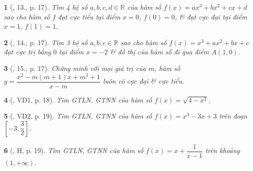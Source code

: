 \documentclass{article}
\newtheorem{baitoan}{}
\begin{document}
\begin{baitoan}[\cite{SGK_Toan_12_giai_tich_nang_cao}, 13., p. 17]
	Tìm 4 hệ số $a,b,c,d\in\mathbb{R}$ của hàm số $f(x) = ax^3 + bx^2 + cx + d$ sao cho hàm số $f$ đạt cực tiểu tại điểm $x = 0$, $f(0) = 0$, \& đạt cực đại tại điểm $x = 1$, $f(1) = 1$.
\end{baitoan}

\begin{baitoan}[\cite{SGK_Toan_12_giai_tich_nang_cao}, 14., p. 17]
	Tìm 3 hệ số $a,b,c\in\mathbb{R}$ sao cho hàm số $f(x) = x^3 + ax^2 + bx + c$ đạt cực trị bằng $0$ tại điểm $x = -2$ \& đồ thị của hàm số đi qua điểm $A(1,0)$.
\end{baitoan}

\begin{baitoan}[\cite{SGK_Toan_12_giai_tich_nang_cao}, 15., p. 17]
	Chứng minh với mọi giá trị của $m$, hàm số $y = \dfrac{x^2 - m(m + 1)x + m^3 + 1}{x - m}$ luôn có cực đại \& cực tiểu.
\end{baitoan}

\begin{baitoan}[\cite{SGK_Toan_12_giai_tich_nang_cao}, VD1, p. 18]
	Tìm {\rm GTLN, GTNN} của hàm số $f(x) = \sqrt{4 - x^2}$.
\end{baitoan}

\begin{baitoan}[\cite{SGK_Toan_12_giai_tich_nang_cao}, VD2, p. 19]
	Tìm {\rm GTLN, GTNN} của hàm số $f(x) = x^3 - 3x + 3$ trên đoạn $\left[-3,\dfrac{3}{2}\right]$.
\end{baitoan}

\begin{baitoan}[\cite{SGK_Toan_12_giai_tich_nang_cao}, H, p. 19]
	Tìm {\rm GTLN, GTNN} của hàm số $f(x) = x + \dfrac{1}{x - 1}$ trên khoảng $(1,+\infty)$.
\end{baitoan}
\end{document}
